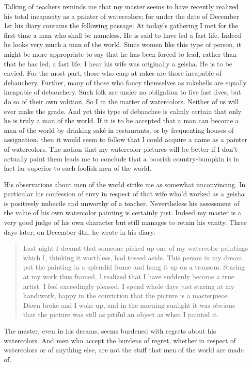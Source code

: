\documentclass{book}
\begin{document}
Talking of teachers reminds me that my master seems to have recently
realized his total incapacity as a painter of watercolors; for under the
date of December 1st his diary contains the following passage: At
today's gathering I met for the first time a man who shall be nameless.
He is said to have led a fast life. Indeed he looks very much a man of
the world. Since women like this type of person, it might be more
appropriate to say that he has been forced to lead, rather than that he
has led, a fast life. I hear his wife was originally a geisha. He is to
be envied. For the most part, those who carp at rakes are those
incapable of debauchery. Further, many of those who fancy themselves as
rakehells are equally incapable of debauchery. Such folk are under no
obligation to live fast lives, but do so of their own volition. So I in
the matter of watercolors. Neither of us will ever make the grade. And
yet this type of debauchee is calmly certain that only he is truly a man
of the world. If it is to be accepted that a man can become a man of the
world by drinking saké in restaurants, or by frequenting houses of
assignation, then it would seem to follow that I could acquire a name as
a painter of watercolors. The notion that my watercolor pictures will be
better if I don't actually paint them leads me to conclude that a
boorish country-bumpkin is in fact far superior to such foolish men of
the world.

His observations about men of the world strike me as somewhat
unconvincing. In particular his confession of envy in respect of that
wife who'd worked as a geisha is positively imbecile and unworthy of a
teacher. Nevertheless his assessment of the value of his own watercolor
painting is certainly just. Indeed my master is a very good judge of his
own character but still manages to retain his vanity. Three days later,
on December 4th, he wrote in his diary:

\blockquote{Last night I dreamt that someone picked up one of my watercolor
paintings which I, thinking it worthless, had tossed aside. This person
in my dream put the painting in a splendid frame and hung it up on a
transom. Staring at my work thus framed, I realized that I have suddenly
become a true artist. I feel exceedingly pleased. I spend whole days
just staring at my handiwork, happy in the conviction that the picture
is a masterpiece. Dawn broke and I woke up, and in the morning sunlight
it was obvious that the picture was still as pitiful an object as when I
painted it.}

The master, even in his dreams, seems burdened with regrets about his
watercolors. And men who accept the burdens of regret, whether in
respect of watercolors or of anything else, are not the stuff that men
of the world are made of.
\end{document}
